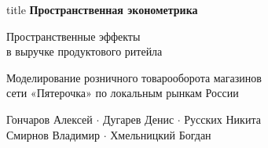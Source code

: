 \documentclass[aspectratio=169,11pt]{beamer}
\begin{document}


\begin{frame}[plain]
\vspace{0.2cm}
\begin{beamercolorbox}[rounded=true,shadow=true,sep=0.4cm,center]{title}
{\large\bfseries Пространственная эконометрика}\par\vspace{0.28cm}
{\LARGE Пространственные эффекты\\в выручке продуктового ритейла}\par\vspace{0.24cm}
{\normalsize Моделирование розничного товарооборота магазинов\\сети «Пятерочка» по локальным рынкам России}
\end{beamercolorbox}
\vspace{0.65cm}\centering
{\normalsize Гончаров Алексей \(\cdot\) Дугарев Денис \(\cdot\) Русских Никита\\[0.15cm]
Смирнов Владимир \(\cdot\) Хмельницкий Богдан}\par
\vspace{0.5cm}{\small Домашнее задание}\par
\vspace{0.4cm}{\small Москва, 2026}
\end{frame}
\end{document}
